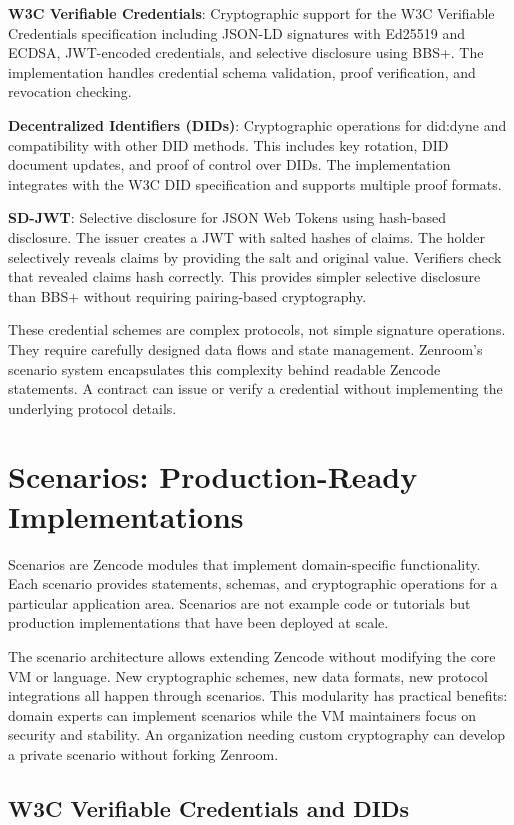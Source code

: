 \textbf{W3C Verifiable Credentials}: Cryptographic support for the W3C
Verifiable Credentials specification including JSON-LD signatures with
Ed25519 and ECDSA, JWT-encoded credentials, and selective disclosure
using BBS+. The implementation handles credential schema validation,
proof verification, and revocation checking.

\textbf{Decentralized Identifiers (DIDs)}: Cryptographic operations
for did:dyne and compatibility with other DID methods. This includes
key rotation, DID document updates, and proof of control over
DIDs. The implementation integrates with the W3C DID specification and
supports multiple proof formats.

\textbf{SD-JWT}: Selective disclosure for JSON Web Tokens using
hash-based disclosure. The issuer creates a JWT with salted hashes of
claims. The holder selectively reveals claims by providing the salt
and original value. Verifiers check that revealed claims hash
correctly. This provides simpler selective disclosure than BBS+
without requiring pairing-based cryptography.

These credential schemes are complex protocols, not simple signature
operations. They require carefully designed data flows and state
management. Zenroom's scenario system encapsulates this complexity
behind readable Zencode statements. A contract can issue or verify a
credential without implementing the underlying protocol details.

\section{Scenarios: Production-Ready Implementations}

Scenarios are Zencode modules that implement domain-specific
functionality. Each scenario provides statements, schemas, and
cryptographic operations for a particular application area. Scenarios
are not example code or tutorials but production implementations that
have been deployed at scale.

The scenario architecture allows extending Zencode without modifying
the core VM or language. New cryptographic schemes, new data formats,
new protocol integrations all happen through scenarios. This
modularity has practical benefits: domain experts can implement
scenarios while the VM maintainers focus on security and stability. An
organization needing custom cryptography can develop a private
scenario without forking Zenroom.

\subsection{W3C Verifiable Credentials and DIDs}

